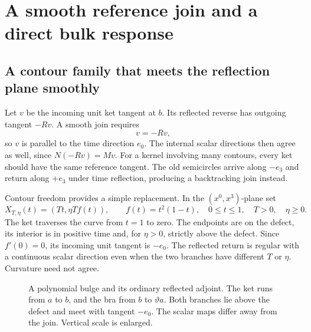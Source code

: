 \section{A smooth reference join and a direct bulk response}\label{sec:response}

\subsection{A contour family that meets the reflection plane smoothly}

Let $v$ be the incoming unit ket tangent at $b$. Its reflected reverse
has outgoing tangent $-Rv$. A smooth join requires
\begin{equation}\label{eq:smooth-join}
 v=-Rv,
\end{equation}
so $v$ is parallel to the time direction $e_0$. The internal scalar
directions then agree as well, since $N(-Rv)=Mv$. For a kernel
involving many contours, every ket should have the same reference
tangent. The old semicircles arrive along $-e_3$ and return along
$+e_3$ under time reflection, producing a backtracking join instead.

Contour freedom provides a simple replacement. In the $(x^0,x^3)$-plane
set
\begin{equation}\label{eq:bulge}
 X_{T,\eta}(t)=(Tt,\eta T f(t)),\qquad f(t)=t^2(1-t),
 \quad0\leq t\leq1,\quad T>0,\quad\eta\geq0.
\end{equation}
The ket traverses the curve from $t=1$ to zero. The endpoints are on
the defect, its interior is in positive time and, for $\eta>0$,
strictly above the defect. Since $f'(0)=0$, its incoming unit tangent
is $-e_0$. The reflected return is regular with a continuous scalar
direction even when the two branches have different $T$ or $\eta$.
Curvature need not agree.

\begin{figure}[htbp]
\centering
{}
\caption{A polynomial bulge and its ordinary reflected adjoint. The
ket runs from $a$ to $b$, and the bra from $b$ to $\vartheta a$.
Both branches lie above the defect and meet with tangent $-e_0$.
The scalar maps differ away from the join. Vertical scale is enlarged.}
\label{fig:join}
\end{figure}

